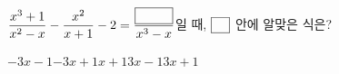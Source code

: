 $\dfrac{x^3+1}{x^2-x}-\dfrac{x^2}{x+1}-2=\dfrac{\blank[3em]}{x^3-x}$일 때, $\blank$ 안에 알맞은 식은?
\begin{choices32}{$-3x-1$}{$-3x+1$}{$x+1$}{$3x-1$}{$3x+1$}\end{choices32}
